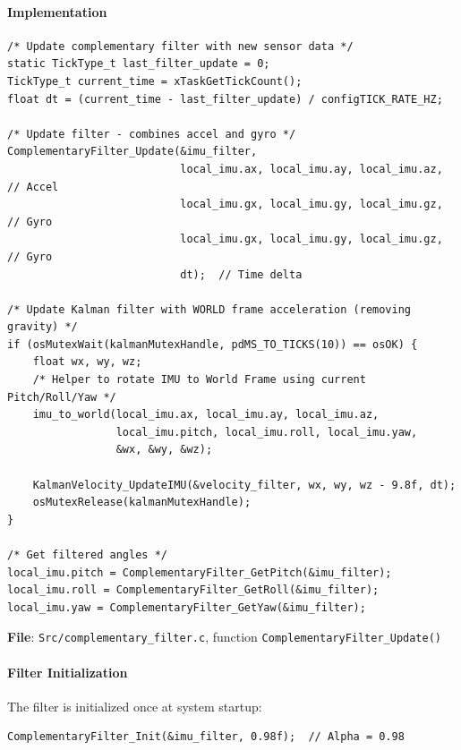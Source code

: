 \documentclass[11pt,a4paper]{article}
\begin{document}
\paragraph{Implementation}
\begin{lstlisting}[caption=Complementary Filter Implementation, label=lst:complementary]
/* Update complementary filter with new sensor data */
static TickType_t last_filter_update = 0;
TickType_t current_time = xTaskGetTickCount();
float dt = (current_time - last_filter_update) / configTICK_RATE_HZ;

/* Update filter - combines accel and gyro */
ComplementaryFilter_Update(&imu_filter,
                           local_imu.ax, local_imu.ay, local_imu.az,  // Accel
                           local_imu.gx, local_imu.gy, local_imu.gz,  // Gyro
                           local_imu.gx, local_imu.gy, local_imu.gz,  // Gyro
                           dt);  // Time delta

/* Update Kalman filter with WORLD frame acceleration (removing gravity) */
if (osMutexWait(kalmanMutexHandle, pdMS_TO_TICKS(10)) == osOK) {
    float wx, wy, wz;
    /* Helper to rotate IMU to World Frame using current Pitch/Roll/Yaw */
    imu_to_world(local_imu.ax, local_imu.ay, local_imu.az, 
                 local_imu.pitch, local_imu.roll, local_imu.yaw, 
                 &wx, &wy, &wz);
                 
    KalmanVelocity_UpdateIMU(&velocity_filter, wx, wy, wz - 9.8f, dt);
    osMutexRelease(kalmanMutexHandle);
}

/* Get filtered angles */
local_imu.pitch = ComplementaryFilter_GetPitch(&imu_filter);
local_imu.roll = ComplementaryFilter_GetRoll(&imu_filter);
local_imu.yaw = ComplementaryFilter_GetYaw(&imu_filter);
\end{lstlisting}

\textbf{File}: \texttt{Src/complementary\_filter.c}, function \texttt{ComplementaryFilter\_Update()}

\paragraph{Filter Initialization}
The filter is initialized once at system startup:

\begin{lstlisting}[caption=Complementary Filter Initialization, label=lst:compinit]
ComplementaryFilter_Init(&imu_filter, 0.98f);  // Alpha = 0.98
\end{lstlisting}
\end{document}
